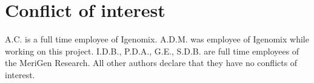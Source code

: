 \section*{Conflict of interest}
A.C. is a full time employee of Igenomix. A.D.M. was employee of Igenomix while working on this project. I.D.B., P.D.A., G.E., S.D.B. are full time employees of the MeriGen Research. All other authors declare that they have no conflicts of interest.